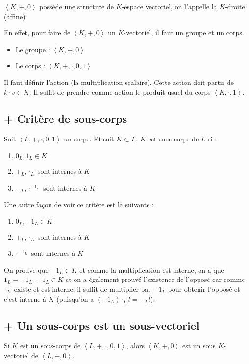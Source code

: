 \documentclass[a4paper,10pt]{article}
\newcommand{\grp}[1]{\left\langle #1 \right\rangle} %
\begin{document}
   $\grp{K, +, 0}$ possède une structure de $K$-espace vectoriel, on l'appelle la $K$-droite (affine).

   En effet, pour faire de $\grp{K, +, 0}$ un $K$-vectoriel, il faut un groupe et un corps.
   \begin{itemize}
    \item Le groupe : $\grp{K, +, 0}$
    \item Le corps : $\grp{K, +, \cdot, 0, 1}$
   \end{itemize}

   Il faut définir l'action (la multiplication scalaire). Cette action doit partir de $k \cdot v \in K$. Il suffit de prendre comme action le produit usuel du corps $\grp{K, \cdot, 1}$.

  \subsection{+ Critère de sous-corps}
   Soit $\grp{L, +, \cdot, 0, 1}$ un corps. Et soit $K \subset L$, $K$ est sous-corps de $L$ si :
   \begin{enumerate}
    \item $0_L, 1_L \in K$
    \item $+_L , \cdot_L $ sont internes à $K$
    \item $-_L , \cdot^{-1_L} $ sont internes à $K$
   \end{enumerate}

   Une autre façon de voir ce critère est la suivante :
   \begin{enumerate}
    \item $0_L, -1_L \in K$
    \item $+_L , \cdot_L $ sont internes à $K$
    \item $\cdot^{-1_L} $ sont internes à $K$
   \end{enumerate}
   On prouve que $-1_L \in K$ et comme la multiplication est interne, on a que $1_L = -1_L \cdot -1_L \in K$ et on a également prouvé l'existence de l'opposé car comme $\cdot_L$ existe et est interne, il suffit de multiplier par $-1_L$ pour obtenir l'opposé et c'est interne à $K$ (puisqu'on a $(-1_L)\cdot_L l = -_Ll$).

  \subsection{+ Un sous-corps est un sous-vectoriel}
   Si $K$ est un sous-corps de $\grp{L, +, \cdot, 0, 1}$, alors $\grp{K, +, 0}$ est un sous $K$-vectoriel de $\grp{L, +, 0}$.
\end{document}

